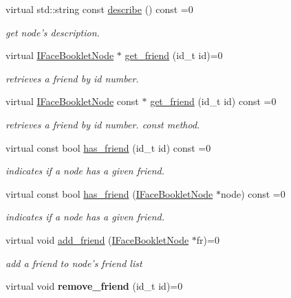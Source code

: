 \begin{DoxyCompactItemize}
\item 
virtual std\+::string const \hyperlink{structfb_1_1_i_face_booklet_node_a4ccb08dfa3ae0af8836cec58f8439adc}{describe} () const =0
\begin{DoxyCompactList}\small\item\em get node's description. \end{DoxyCompactList}\item 
virtual \hyperlink{structfb_1_1_i_face_booklet_node}{I\+Face\+Booklet\+Node} $\ast$ \hyperlink{structfb_1_1_i_face_booklet_node_ae78da353e70e25f3fac8976618bfcde8}{get\+\_\+friend} (id\+\_\+t id)=0
\begin{DoxyCompactList}\small\item\em retrieves a friend by id number. \end{DoxyCompactList}\item 
virtual \hyperlink{structfb_1_1_i_face_booklet_node}{I\+Face\+Booklet\+Node} const $\ast$ \hyperlink{structfb_1_1_i_face_booklet_node_a3a1b982ac4239e23c2204c7746dc90f0}{get\+\_\+friend} (id\+\_\+t id) const =0
\begin{DoxyCompactList}\small\item\em retrieves a friend by id number. const method. \end{DoxyCompactList}\item 
virtual const bool \hyperlink{structfb_1_1_i_face_booklet_node_a2692d3ad9e903bd545c7074c710e5cdc}{has\+\_\+friend} (id\+\_\+t id) const =0
\begin{DoxyCompactList}\small\item\em indicates if a node has a given friend. \end{DoxyCompactList}\item 
virtual const bool \hyperlink{structfb_1_1_i_face_booklet_node_af821de82c96e235108ca909a92838dc1}{has\+\_\+friend} (\hyperlink{structfb_1_1_i_face_booklet_node}{I\+Face\+Booklet\+Node} $\ast$node) const =0
\begin{DoxyCompactList}\small\item\em indicates if a node has a given friend. \end{DoxyCompactList}\item 
\hypertarget{structfb_1_1_i_face_booklet_node_a1add30a9097411c481cf0fe2cf69f648}{virtual void \hyperlink{structfb_1_1_i_face_booklet_node_a1add30a9097411c481cf0fe2cf69f648}{add\+\_\+friend} (\hyperlink{structfb_1_1_i_face_booklet_node}{I\+Face\+Booklet\+Node} $\ast$fr)=0}\label{structfb_1_1_i_face_booklet_node_a1add30a9097411c481cf0fe2cf69f648}

\begin{DoxyCompactList}\small\item\em add a friend to node's friend list \end{DoxyCompactList}\item 
\hypertarget{structfb_1_1_i_face_booklet_node_a7cc6a24cc5863b5d095369faa2066042}{virtual void {\bfseries remove\+\_\+friend} (id\+\_\+t id)=0}\label{structfb_1_1_i_face_booklet_node_a7cc6a24cc5863b5d095369faa2066042}

\end{DoxyCompactItemize}
